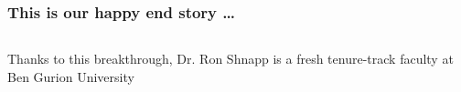 \begin{frame}[label=why-5]
\frametitle{This is our happy end story \ldots }
\begin{columns}
    \centering {}
    Thanks to this breakthrough, Dr. Ron Shnapp is a fresh tenure-track faculty at Ben Gurion University
\end{columns}
\end{frame}









